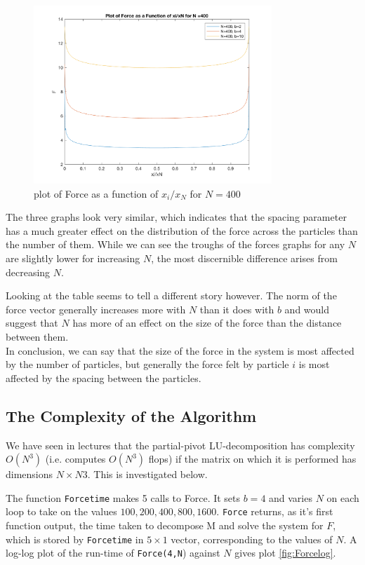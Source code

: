 \documentclass[paper=a4, fontsize=12pt]{scrartcl} %
\numberwithin{equation}{section}       %
\numberwithin{figure}{section}         %
\numberwithin{table}{section}          %
\begin{document}
\begin{figure}[h!]
  \centering
  \includegraphics[width=0.8\textwidth]{Plot_of_Force_N400.png}
  \caption{plot of Force as a function of $x_i/x_N$ for $N=400$}
  \label{fig:Fplot3}
\end{figure}
\newpage 
\noindent The three graphs look very similar, which indicates that the spacing parameter has a much greater effect on the distribution of the force across the particles than the number of them. While we can see the troughs of the forces graphs for any $N$ are slightly lower for increasing $N$, the most discernible difference arises from decreasing $N$. 

\indent Looking at the table seems to tell a different story however. The norm of the force vector generally increases more with $N$ than it does with $b$ and would suggest that $N$ has more of an effect on the size of the force than the distance between them. \\

\noindent In conclusion, we can say that the size of the force in the system is most affected by the number of particles, but generally the force felt by particle $i$ is most affected by the spacing between the particles. 


\newpage 
\subsection{The Complexity of the Algorithm} 
We have seen in lectures that the partial-pivot LU-decomposition has complexity $O(N^3)$ (i.e. computes $O(N^3)$ flops) if the matrix on which it is performed has dimensions $N\times N3$. This is investigated below. 

\indent The function \texttt{Forcetime} makes 5 calls to Force. It sets $b=4$ and varies $N$ on each loop to take on  the values $100, 200, 400, 800, 1600$. \texttt{Force} returns, as it's first function output, the time taken to decompose M and solve the system for $F$, which is stored by \texttt{Forcetime} in $5\times 1$ vector, corresponding to the values of $N$. A log-log plot of the run-time of \texttt{Force(4,N}) against $N$ gives plot \ref{fig:Forcelog}.
\end{document}
